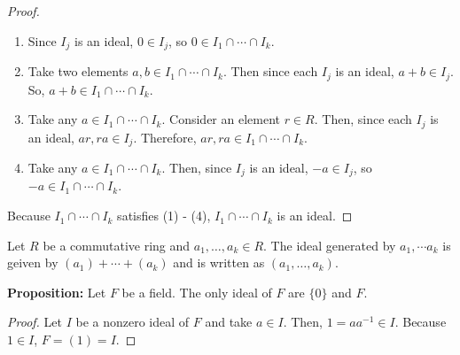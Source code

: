 \documentclass [12pt] {article}
\newenvironment{definition}[1]{\begin{tcolorbox}[title={Definition: #1},colback=blue!5!white,colframe=black!75!blue]}{\end{tcolorbox}}
\renewcommand{\bf}[1]{\textbf{{#1}}}
\begin{document}
\begin{proof}
    \begin{enumerate}[label=(\arabic*), itemsep=0em]
        \item Since $I_j$ is an ideal, $0 \in I_j$, so 
            $0 \in I_1 \cap \cdots \cap I_k$.
        \item Take two elements $a, b \in I_1 \cap \cdots \cap I_k$. 
            Then since each $I_j$ is an ideal, $a + b \in I_j$. So, 
            $a + b \in I_1 \cap \cdots \cap I_k$.
        \item Take any $a \in I_1 \cap \cdots \cap I_k$. Consider an element 
            $r \in R$. Then, since each $I_j$ is an ideal, $ar, ra \in I_j$. Therefore, 
            $ar, ra \in I_1 \cap \cdots \cap I_k$.
        \item Take any $a \in I_1 \cap \cdots \cap I_k$. 
            Then, since $I_j$ is an ideal, $-a \in I_j$, so $-a \in I_1 \cap \cdots \cap I_k$.
    \end{enumerate}
    Because $I_1 \cap \cdots \cap I_k$ satisfies (1) - (4), $I_1 \cap \cdots \cap I_k$ is an ideal.
\end{proof}

\begin{definition}{Multiple Generators}
    Let $R$ be a commutative ring and $a_1, \ldots, a_k \in R$. The ideal generated by 
    $a_1, \cdots a_k$ is geiven by $(a_1) + \cdots + (a_k)$ and is written as $(a_1, \ldots, a_k)$.
\end{definition}
\bf{Proposition:} Let $F$ be a field. The only ideal of $F$ are $\{ 0 \}$ and $F$.
\begin{proof}
    Let $I$ be a nonzero ideal of $F$ and take $a \in I$. Then, $1 = aa^{-1} \in I$. Because $1 \in I$, 
    $F = (1) = I$.
\end{proof}
\end{document}
